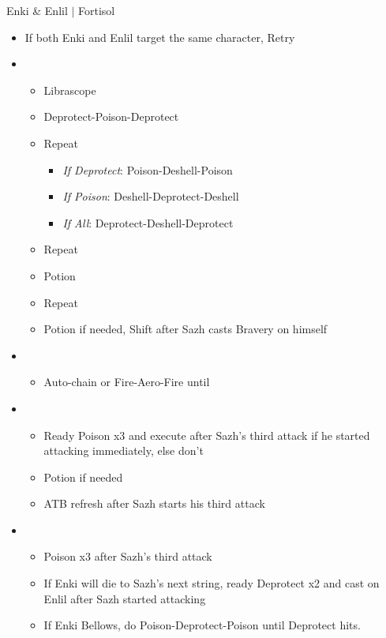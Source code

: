 \begin{battle}{Enki \& Enlil $|$ Fortisol}
\begin{multicols}{2}
\begin{itemize}
    \item If both Enki and Enlil target the same character, Retry
    \item \third
    \begin{itemize}
        \item Librascope
        \item Deprotect-Poison-Deprotect
        \item Repeat
        \begin{itemize}
            \item \textit{If Deprotect}: Poison-Deshell-Poison
            \item \textit{If Poison}: Deshell-Deprotect-Deshell
            \item \textit{If All}: Deprotect-Deshell-Deprotect
        \end{itemize}
        \item Repeat
        \item Potion
        \item Repeat
        \item Potion if needed, Shift after Sazh casts Bravery on himself
    \end{itemize}
    \item \fourth
    \begin{itemize}
        \item Auto-chain or Fire-Aero-Fire until \stagger
    \end{itemize}
    \item \sixth
    \begin{itemize}
        \item Ready Poison x3 and execute after Sazh's third attack if he started attacking immediately, else don't
        \item Potion if needed
        \item ATB refresh after Sazh starts his third attack
    \end{itemize}
    \item \second
    \begin{itemize}
        \item Poison x3 after Sazh's third attack
        \item If Enki will die to Sazh's next string, ready Deprotect x2 and cast on Enlil after Sazh started attacking
        \item If Enki Bellows, do Poison-Deprotect-Poison until Deprotect hits.

\end{itemize}
\end{itemize}
\end{multicols}
\end{battle}
